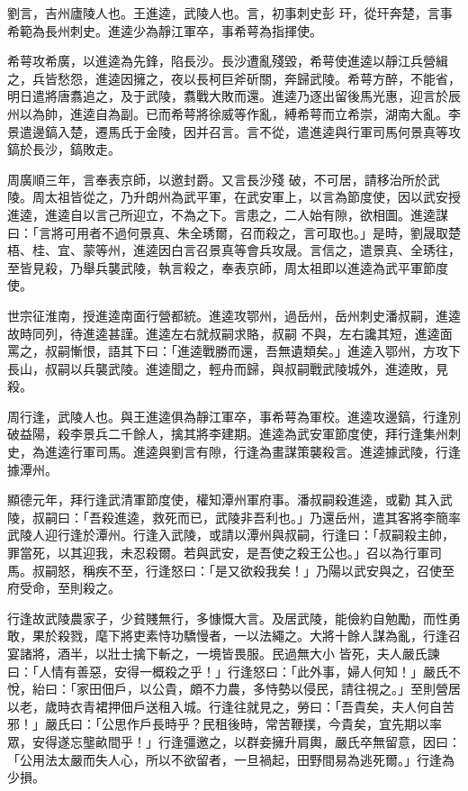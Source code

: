 \begin{pinyinscope}
 劉言，吉州廬陵人也。王進逵，武陵人也。言，初事刺史彭
 玕，從玕奔楚，言事希範為長州刺史。進逵少為靜江軍卒，事希萼為指揮使。



 希萼攻希廣，以進逵為先鋒，陷長沙。長沙遭亂殘毀，希萼使進逵以靜江兵營緝之，兵皆愁怨，進逵因擁之，夜以長柯巨斧斫關，奔歸武陵。希萼方醉，不能省，明日遣將唐翥追之，及于武陵，翥戰大敗而還。進逵乃逐出留後馬光惠，迎言於辰州以為帥，進逵自為副。已而希萼將徐威等作亂，縛希萼而立希崇，湖南大亂。李景遣邊鎬入楚，遷馬氏于金陵，因并召言。言不從，遣進逵與行軍司馬何景真等攻鎬於長沙，鎬敗走。



 周廣順三年，言奉表京師，以邀封爵。又言長沙殘
 破，不可居，請移治所於武陵。周太祖皆從之，乃升朗州為武平軍，在武安軍上，以言為節度使，因以武安授進逵，進逵自以言己所迎立，不為之下。言患之，二人始有隙，欲相圖。進逵謀曰：「言將可用者不過何景真、朱全琇爾，召而殺之，言可取也。」是時，劉晟取楚梧、桂、宜、蒙等州，進逵因白言召景真等會兵攻晟。言信之，遣景真、全琇往，至皆見殺，乃舉兵襲武陵，執言殺之，奉表京師，周太祖即以進逵為武平軍節度使。



 世宗征淮南，授進逵南面行營都統。進逵攻鄂州，過岳州，岳州刺史潘叔嗣，進逵故時同列，待進逵甚謹。進逵左右就叔嗣求賂，叔嗣
 不與，左右讒其短，進逵面罵之，叔嗣慚恨，語其下曰：「進逵戰勝而還，吾無遺類矣。」進逵入鄂州，方攻下長山，叔嗣以兵襲武陵。進逵聞之，輕舟而歸，與叔嗣戰武陵城外，進逵敗，見殺。



 周行逢，武陵人也。與王進逵俱為靜江軍卒，事希萼為軍校。進逵攻邊鎬，行逢別破益陽，殺李景兵二千餘人，擒其將李建期。進逵為武安軍節度使，拜行逢集州刺史，為進逵行軍司馬。進逵與劉言有隙，行逢為畫謀策襲殺言。進逵據武陵，行逢據潭州。



 顯德元年，拜行逢武清軍節度使，權知潭州軍府事。潘叔嗣殺進逵，或勸
 其入武陵，叔嗣曰：「吾殺進逵，救死而已，武陵非吾利也。」乃還岳州，遣其客將李簡率武陵人迎行逢於潭州。行逢入武陵，或請以潭州與叔嗣，行逢曰：「叔嗣殺主帥，罪當死，以其迎我，未忍殺爾。若與武安，是吾使之殺王公也。」召以為行軍司馬。叔嗣怒，稱疾不至，行逢怒曰：「是又欲殺我矣！」乃陽以武安與之，召使至府受命，至則殺之。



 行逢故武陵農家子，少貧賤無行，多慷慨大言。及居武陵，能儉約自勉勵，而性勇敢，果於殺戮，麾下將吏素恃功驕慢者，一以法繩之。大將十餘人謀為亂，行逢召宴諸將，酒半，以壯士擒下斬之，一境皆畏服。民過無大小
 皆死，夫人嚴氏諫曰：「人情有善惡，安得一概殺之乎！」行逢怒曰：「此外事，婦人何知！」嚴氏不悅，紿曰：「家田佃戶，以公貴，頗不力農，多恃勢以侵民，請往視之。」至則營居以老，歲時衣青裙押佃戶送租入城。行逢往就見之，勞曰：「吾貴矣，夫人何自苦邪！」嚴氏曰：「公思作戶長時乎？民租後時，常苦鞭撲，今貴矣，宜先期以率眾，安得遂忘壟畝間乎！」行逢彊邀之，以群妾擁升肩輿，嚴氏卒無留意，因曰：「公用法太嚴而失人心，所以不欲留者，一旦禍起，田野間易為逃死爾。」行逢為少損。




\end{pinyinscope}
